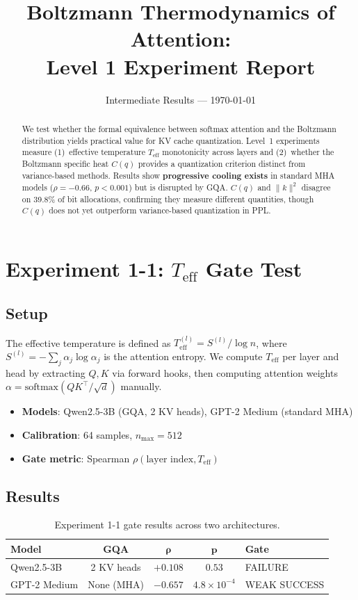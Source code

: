 \documentclass[11pt,a4paper]{article}
\title{Boltzmann Thermodynamics of Attention:\\Level 1 Experiment Report}
\author{Intermediate Results --- \today}
\date{}
\begin{document}
\maketitle

\begin{abstract}
We test whether the formal equivalence between softmax attention and the Boltzmann distribution yields practical value for KV cache quantization.
Level~1 experiments measure (1)~effective temperature $T_\mathrm{eff}$ monotonicity across layers and (2)~whether the Boltzmann specific heat $C(q)$ provides a quantization criterion distinct from variance-based methods.
Results show \textbf{progressive cooling exists} in standard MHA models ($\rho=-0.66$, $p<0.001$) but is disrupted by GQA.
$C(q)$ and $\|k\|^2$ disagree on 39.8\% of bit allocations, confirming they measure different quantities, though $C(q)$ does not yet outperform variance-based quantization in PPL.
\end{abstract}

\section{Experiment 1-1: $T_\mathrm{eff}$ Gate Test}

\subsection{Setup}
The effective temperature is defined as $T_\mathrm{eff}^{(l)} = S^{(l)} / \log n$, where $S^{(l)} = -\sum_j \alpha_j \log \alpha_j$ is the attention entropy.
We compute $T_\mathrm{eff}$ per layer and head by extracting $Q, K$ via forward hooks, then computing attention weights $\alpha = \mathrm{softmax}(QK^\top / \sqrt{d})$ manually.

\begin{itemize}[nosep]
  \item \textbf{Models}: Qwen2.5-3B (GQA, 2 KV heads), GPT-2 Medium (standard MHA)
  \item \textbf{Calibration}: 64 samples, $n_\mathrm{max} = 512$
  \item \textbf{Gate metric}: Spearman $\rho(\text{layer index}, T_\mathrm{eff})$
\end{itemize}

\subsection{Results}

\begin{table}[H]
\centering
\caption{Experiment 1-1 gate results across two architectures.}
\label{tab:gate}
\begin{tabular}{lcccl}
\toprule
\textbf{Model} & \textbf{GQA} & $\boldsymbol{\rho}$ & $\boldsymbol{p}$ & \textbf{Gate} \\
\midrule
Qwen2.5-3B & 2 KV heads & $+0.108$ & $0.53$ & \textcolor{failure}{FAILURE} \\
GPT-2 Medium & None (MHA) & $-0.657$ & $4.8\times10^{-4}$ & \textcolor{partial}{WEAK SUCCESS} \\
\bottomrule
\end{tabular}
\end{table}
\end{document}
